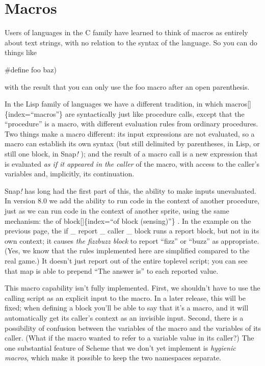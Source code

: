 \documentclass[
  letterpaper,
]{book}
\begin{document}
\section{Macros}\label{macros}

Users of languages in the C family have learned to think of macros as
entirely about text strings, with no relation to the syntax of the
language. So you can do things like

\#define foo baz)

with the result that you can only use the foo macro after an open
parenthesis.

In the Lisp family of languages we have a different tradition, in which
macros{[}{]}\{index=``macros''\} are syntactically just like procedure
calls, except that the ``procedure'' is a macro, with different
evaluation rules from ordinary procedures. Two things make a macro
different: its input expressions are not evaluated, so a macro can
establish its own syntax (but still delimited by parentheses, in Lisp,
or still one block, in Snap\emph{!} ); and the result of a macro call is
a new expression that is evaluated \emph{as if it appeared in the
caller} of the macro, with access to the caller's variables and,
implicitly, its continuation.

Snap\emph{!} has long had the first part of this, the ability to make
inputs unevaluated. In version 8.0 we add the ability to run code in the
context of another procedure, just as we can run code in the context of
another sprite, using the same mechanism: the of block{[}{]}\{index=``of
block (sensing)''\} . In the example on the previous page, the if \_
report \_ caller \_ block runs a report block, but not in its own
context; it causes \emph{the fizzbuzz block} to report ``fizz'' or
``buzz'' as appropriate. (Yes, we know that the rules implemented here
are simplified compared to the real game.) It doesn't just report out of
the entire toplevel script; you can see that map is able to prepend
``The answer is'' to each reported value.

This macro capability isn't fully implemented. First, we shouldn't have
to use the calling script as an explicit input to the macro. In a later
release, this will be fixed; when defining a block you'll be able to say
that it's a macro, and it will automatically get its caller's context as
an invisible input. Second, there is a possibility of confusion between
the variables of the macro and the variables of its caller. (What if the
macro wanted to refer to a variable value in its caller?) The one
substantial feature of Scheme that we don't yet implement is
\emph{hygienic macros,} which make it possible to keep the two
namespaces separate.
\end{document}

